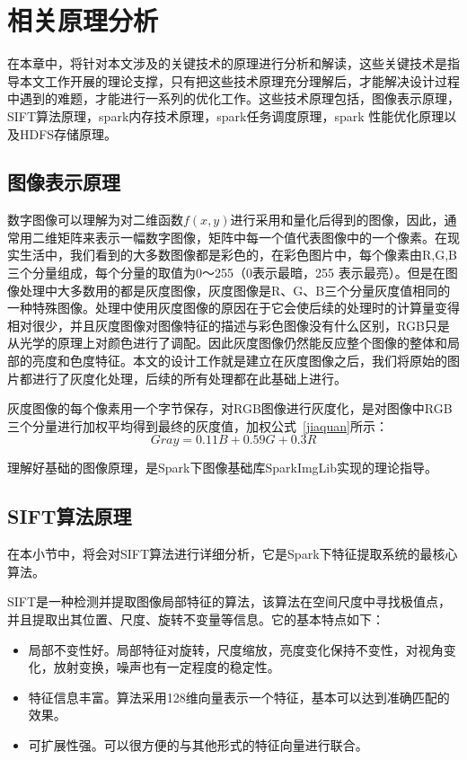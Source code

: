 ﻿\chapter{相关原理分析}
\label{xiangguanyuanli}
在本章中，将针对本文涉及的关键技术的原理进行分析和解读，这些关键技术是指导本文工作开展的理论支撑，只有把这些技术原理充分理解后，才能解决设计过程中遇到的难题，才能进行一系列的优化工作。这些技术原理包括，图像表示原理，SIFT算法原理，spark内存技术原理，spark任务调度原理，spark 性能优化原理以及HDFS存储原理。
\section{图像表示原理}
数字图像可以理解为对二维函数$f(x,y)$进行采用和量化后得到的图像，因此，通常用二维矩阵来表示一幅数字图像，矩阵中每一个值代表图像中的一个像素。在现实生活中，我们看到的大多数图像都是彩色的，在彩色图片中，每个像素由R,G,B三个分量组成，每个分量的取值为0～255（0表示最暗，255 表示最亮）。但是在图像处理中大多数用的都是灰度图像，灰度图像是R、G、B三个分量灰度值相同的一种特殊图像。处理中使用灰度图像的原因在于它会使后续的处理时的计算量变得相对很少，并且灰度图像对图像特征的描述与彩色图像没有什么区别，RGB只是从光学的原理上对颜色进行了调配。因此灰度图像仍然能反应整个图像的整体和局部的亮度和色度特征。本文的设计工作就是建立在灰度图像之后，我们将原始的图片都进行了灰度化处理，后续的所有处理都在此基础上进行。

灰度图像的每个像素用一个字节保存，对RGB图像进行灰度化，是对图像中RGB三个分量进行加权平均得到最终的灰度值，加权公式~\ref{jiaquan}所示：
\begin{equation}\label{jiaquan}
 Gray = 0.11B + 0.59G + 0.3R
\end{equation}

理解好基础的图像原理，是Spark下图像基础库SparkImgLib实现的理论指导。
\section{SIFT算法原理}
\label{sec:sift}
在本小节中，将会对SIFT算法进行详细分析，它是Spark下特征提取系统的最核心算法。

SIFT是一种检测并提取图像局部特征的算法，该算法在空间尺度中寻找极值点，并且提取出其位置、尺度、旋转不变量等信息。它的基本特点如下：
\begin{itemize}
\item 局部不变性好。局部特征对旋转，尺度缩放，亮度变化保持不变性，对视角变化，放射变换，噪声也有一定程度的稳定性。
\item 特征信息丰富。算法采用128维向量表示一个特征，基本可以达到准确匹配的效果。
\item 可扩展性强。可以很方便的与其他形式的特征向量进行联合。
\end{itemize}

